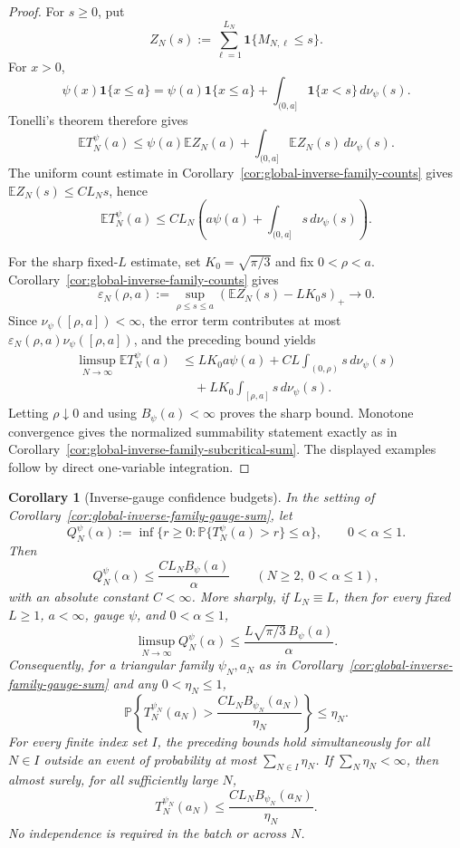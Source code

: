 \documentclass[11pt]{amsart}
\numberwithin{equation}{section}
\newtheorem{corollary}[theorem]{Corollary}
\theoremstyle{definition}
\theoremstyle{remark}
\newcommand{\Prob}{\mathbb P}
\newcommand{\Exp}{\mathbb E}
\begin{document}
\begin{proof}
For \(s\ge0\), put
\[
  Z_N(s):=\sum_{\ell=1}^{L_N}\mathbf1\{M_{N,\ell}\le s\}.
\]
For \(x>0\),
\[
  \psi(x)\mathbf1\{x\le a\}
  =
  \psi(a)\mathbf1\{x\le a\}
  +
  \int_{(0,a]}\mathbf1\{x<s\}\,d\nu_\psi(s) .
\]
Tonelli's theorem therefore gives
\[
  \Exp T_N^\psi(a)
  \le
  \psi(a)\Exp Z_N(a)
  +
  \int_{(0,a]}\Exp Z_N(s)\,d\nu_\psi(s) .
\]
The uniform count estimate in Corollary~\ref{cor:global-inverse-family-counts}
gives \(\Exp Z_N(s)\le CL_Ns\), hence
\[
  \Exp T_N^\psi(a)
  \le
  CL_N\left(a\psi(a)+\int_{(0,a]}s\,d\nu_\psi(s)\right).
\]

For the sharp fixed-\(L\) estimate, set \(K_0=\sqrt{\pi/3}\) and fix
\(0<\rho<a\).  Corollary~\ref{cor:global-inverse-family-counts} gives
\[
  \varepsilon_N(\rho,a):=
  \sup_{\rho\le s\le a}
  \left(\Exp Z_N(s)-LK_0s\right)_+\longrightarrow0 .
\]
Since \(\nu_\psi([\rho,a])<\infty\), the error term contributes at most
\(\varepsilon_N(\rho,a)\nu_\psi([\rho,a])\), and the preceding bound yields
\[
\begin{aligned}
  \limsup_{N\to\infty}\Exp T_N^\psi(a)
  &\le
  LK_0a\psi(a)
  +CL\int_{(0,\rho)}s\,d\nu_\psi(s)  \\
  &\quad
  +LK_0\int_{[\rho,a]}s\,d\nu_\psi(s) .
\end{aligned}
\]
Letting \(\rho\downarrow0\) and using \(B_\psi(a)<\infty\) proves the sharp
bound.  Monotone convergence gives the normalized summability statement exactly
as in Corollary~\ref{cor:global-inverse-family-subcritical-sum}.  The displayed
examples follow by direct one-variable integration.
\end{proof}

\begin{corollary}[Inverse-gauge confidence budgets]
\label{cor:global-inverse-family-gauge-confidence}
In the setting of Corollary~\ref{cor:global-inverse-family-gauge-sum}, let
\[
  Q_N^\psi(\alpha)
  :=
  \inf\{r\ge0:\Prob\{T_N^\psi(a)>r\}\le\alpha\},
  \qquad 0<\alpha\le1.
\]
Then
\[
  Q_N^\psi(\alpha)\le \frac{C L_NB_\psi(a)}{\alpha}
  \qquad(N\ge2,\ 0<\alpha\le1),
\]
with an absolute constant \(C<\infty\).  More sharply, if \(L_N\equiv L\), then
for every fixed \(L\ge1\), \(a<\infty\), gauge \(\psi\), and
\(0<\alpha\le1\),
\[
  \limsup_{N\to\infty}Q_N^\psi(\alpha)
  \le
  \frac{L\sqrt{\pi/3}\,B_\psi(a)}{\alpha}.
\]
Consequently, for a triangular family \(\psi_N,a_N\) as in
Corollary~\ref{cor:global-inverse-family-gauge-sum} and any
\(0<\eta_N\le1\),
\[
  \Prob\left\{
    T_N^{\psi_N}(a_N)>
    \frac{C L_NB_{\psi_N}(a_N)}{\eta_N}
  \right\}\le \eta_N .
\]
For every finite index set \(I\), the preceding bounds hold simultaneously for
all \(N\in I\) outside an event of probability at most \(\sum_{N\in I}\eta_N\).
If \(\sum_N\eta_N<\infty\), then almost surely, for all sufficiently large
\(N\),
\[
  T_N^{\psi_N}(a_N)\le
  \frac{C L_NB_{\psi_N}(a_N)}{\eta_N}.
\]
No independence is required in the batch or across \(N\).
\end{corollary}
\end{document}
